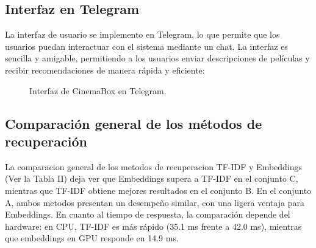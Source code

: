 \begin{table}[htbp]
    \centering
    \caption{Intervalos de confianza del 95\% para la diferencia de MRR entre TF-IDF y Embeddings.}
    \label{tab:intervalos_confianza_mrr}
\end{table}

\subsection{Interfaz en Telegram}

La interfaz de usuario se implemento en Telegram, lo que permite que los usuarios puedan interactuar con el sistema mediante un chat. La interfaz es sencilla y amigable, permitiendo a los usuarios enviar descripciones de películas y recibir recomendaciones de manera rápida y eficiente:

\begin{figure}[t]
\centering
{}
\caption{Interfaz de CinemaBox en Telegram.}
\label{fig:interfaz_telegram}
\end{figure}

\subsection{Comparación general de los métodos de recuperación}

La comparacion general de los metodos de recuperacion TF-IDF y Embeddings (Ver la Tabla II) deja ver que Embeddings supera a TF-IDF en el conjunto C, mientras que TF-IDF obtiene mejores resultados en el conjunto B. En el conjunto A, ambos metodos presentan un desempeño similar, con una ligera ventaja para Embeddings. En cuanto al tiempo de respuesta, la comparación depende del hardware: en CPU, TF-IDF es más rápido (35.1 ms frente a 42.0 ms), mientras que embeddings en GPU responde en 14.9 ms.
